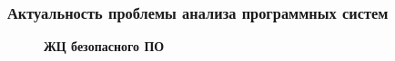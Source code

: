 \documentclass[hyperref={pdfpagelabels=false},10pt,gray]{beamer}
\begin{document}
\begin{frame}
\frametitle{Актуальность проблемы анализа программных систем}
\begin{figure}[h]
    
    \textbf{ЖЦ безопасного ПО}

% 
\end{figure}
\end{frame}
\end{document}
